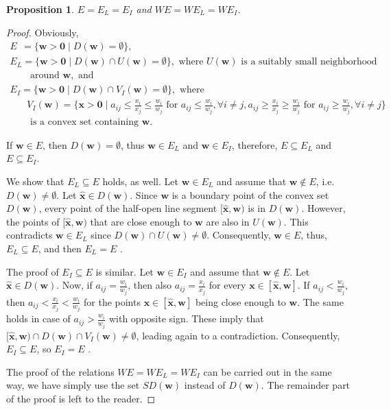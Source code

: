 \documentclass{article}
\theoremstyle{plain}
\newtheorem{proposition}{Proposition}[section]
\begin{document}
\medskip
\begin{proposition} \label{proposition:EandWEandEquivalentForms}
$E=E_L=E_I$ and $W\!E=W\!E_L=W\!E_I$.
\end{proposition}
\begin{proof}
Obviously,
$$
\begin{array}{lllll}
E\ \ =\{\mathbf{w}>\mathbf{0}\mid D(\mathbf{w})=\emptyset\},\\
E_L=\{\mathbf{w}>\mathbf{0}\mid D(\mathbf{w})\cap U(\mathbf{w})=\emptyset\},
\text{ where } U(\mathbf{w})
\text{ is a suitably small neighborhood}\\ ~~~~~~~~\text{ around } \mathbf{w},\text{ and }\\
E_I=\{\mathbf{w}>\mathbf{0}\mid D(\mathbf{w})\cap V_I(\mathbf{w})=\emptyset\},
\text{ where } \\
~~~~~~~~V_I(\mathbf{w})=\{\mathbf{x}>\mathbf{0}\mid a_{ij}\le \frac{x_i}{x_j}\le  \frac{w_i}{w_j}\text{ for }  a_{ij}\le   \frac{w_i}{w_j}, \forall i\ne j,
 a_{ij}\ge \frac{x_i}{x_j}\ge  \frac{w_i}{w_j}\text{ for }  a_{ij}\ge   \frac{w_i}{w_j}, \forall i\ne j \}\\
~~~~~~~~\text{ is a convex set containing } \mathbf{w}.
\end{array}
$$

If $\mathbf{w}\in E$, then $D(\mathbf{w})=\emptyset$, thus $\mathbf{w}\in E_L$ and $\mathbf{w}\in E_I$, therefore, $E\subseteq E_L$ and $E\subseteq E_I$.

We show that $E_L\subseteq E$ holds, as well. Let $\mathbf{w}\in E_L$ and assume that $\mathbf{w}\not\in E$, i.e.\ $D(\mathbf{w})\ne\emptyset$. Let $\mathbf{\hat{x}}\in D(\mathbf{w})$.  Since
$\mathbf{w}$ is a boundary point of the convex set $D(\mathbf{w})$, every point of the half-open line segment $[\mathbf{\hat{x}}, \mathbf{w})$ is in $D(\mathbf{w})$. However, the points of $[\mathbf{\hat{x}}, \mathbf{w})$ that are close enough to $\mathbf{w}$ are also in $U(\mathbf{w})$. This contradicts
$\mathbf{w}\in E_L$ since $D(\mathbf{w})\cap U(\mathbf{w})\ne\emptyset$. Consequently, $\mathbf{w}\in E$, thus,
$E_L\subseteq E$, and then $E_L = E$ .

The proof of $E_I\subseteq E$ is similar.
Let $\mathbf{w}\in E_I$ and assume that $\mathbf{w}\not\in E$. Let $\mathbf{\hat{x}}\in D(\mathbf{w})$. Now, if $a_{ij}=\frac{w_i}{w_j}$, then also
$a_{ij}=\frac{x_i}{x_j}$ for every $\mathbf{x}\in [\mathbf{\hat{x}},\mathbf{w}]$. If  $a_{ij}<\frac{w_i}{w_j}$, then
$a_{ij}<\frac{x_i}{x_j}<\frac{w_i}{w_j}$ for the points $\mathbf{x}\in [\mathbf{\hat{x}},\mathbf{w}]$ being close enough  to $\mathbf{w}$. The same holds in case of  $a_{ij}>\frac{w_i}{w_j}$ with opposite sign.  These imply that $[\mathbf{\hat{x}},\mathbf{w})\cap D(\mathbf{w})\cap V_I(\mathbf{w})\ne\emptyset$, leading again to a contradiction. Consequently,
$E_I\subseteq E$, so $E_I = E$ .

The proof of the relations $W\!E=W\!E_L=W\!E_I$ can be carried out in the same way, we have simply use the set $SD(\mathbf{w})$ instead of $D(\mathbf{w})$. The remainder part of the proof is left to the reader.
\end{proof}
\end{document}
